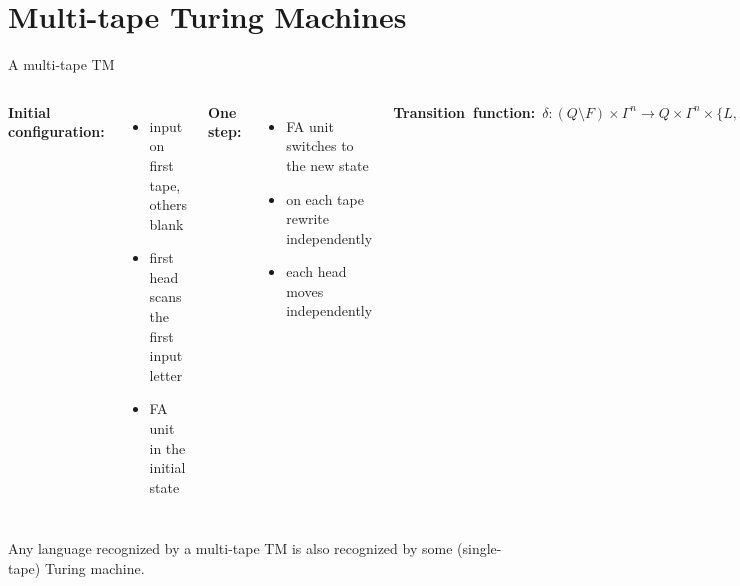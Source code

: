 \documentclass[handout]{beamer}
\begin{document}
\section*{Multi-tape Turing Machines}


\begin{frame}{A multi-tape TM}

    \begin{columns}


        \textbf{Initial configuration:}
        \begin{itemize}
            \item input on first tape, others blank
            \item first head scans the first input letter
            \item FA unit in the initial state
        \end{itemize}    
        \textbf{One step:}
        \begin{itemize}
            \item FA unit switches to the new state
            \item on each tape rewrite independently            
            \item each head moves independently
        \end{itemize}
        \mbox{\textbf{Transition function:} $\delta\colon(Q\setminus F)\times\Gamma^n\rightarrow Q\times \Gamma^n\times \{L,R\}^n$}
    
    
    
        \includegraphics[width=1.1\textwidth]{files/tmmultitape.PNG}
        
    \end{columns}

    \bigskip

    \begin{theorem}
        Any language recognized by a multi-tape TM is also recognized by some (single-tape) Turing machine.
    \end{theorem}

\end{frame}
\end{document}
